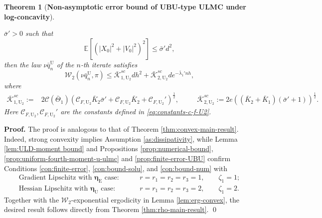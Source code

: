 \documentclass[12pt]{article}
\newenvironment{redtext}
  {\color{black}\ignorespaces}
  {\ignorespacesafterend}
\numberwithin{equation}{section}
\renewenvironment{proof}%
  {\begin{trivlist}%
   \item[]\ignorespaces}%
  {\qed\end{trivlist}}
\newtheorem{thm}{Theorem}[section]
\begin{document}
\begin{redtext}
\begin{thm}[\textbf{Non-asymptotic error bound of UBU-type ULMC under log-concavity}]
\begin{enumerate}
\(\bar\sigma'>0\) such that
\begin{equation}
\label{eq:condition-of-initial-value-UBU-hl}
\mathbb E
\left[
\left(
|X_0|^2+|V_0|^2
\right)^2
\right]
\leq
\bar\sigma' d^2,
\end{equation}
then the law \(\nu\bar q^{\mathrm U}_n\) of the \(n\)-th iterate satisfies
\begin{equation}
\label{eq:convex-main-result-UBU}
\mathcal W_2
\left(
\nu\bar q^{\mathrm U}_n,
\pi
\right)
\leq
\bar{\mathcal K}_{1,\mathrm{U}_2}^{sc}
d h^2
+
\bar{\mathcal K}_{2,\mathrm{U}_2}^{sc}
d
e^{-\bar\lambda_1'nh},
\end{equation}
where
\begin{align*}
\bar{\mathcal K}_{1,\mathrm{U}_2}^{sc}
:={}&
2
\mathcal C(\bar\Theta_1)
\left(
\mathcal C_{F,\mathrm{U}_2}\bar K_2\bar\sigma' 
+
\mathcal C_{F,\mathrm{U}_2}\bar K_2
+
\mathcal C_{F,\mathrm{U}_2}'
\right)^{\frac12},
&\quad&
\bar{\mathcal K}_{2,\mathrm{U}_2}^{sc}
:=
2e
\left(
(\bar K_2+\bar K_1)
(\bar\sigma' +1)
\right)^{\frac12}.
\end{align*}
Here \(\mathcal C_{F,\mathrm{U}_2},\mathcal C_{F,\mathrm{U}_2}'\) are the constants defined in \eqref{eq:constants-c-f-U2}.
\end{enumerate}


\end{thm}

\begin{proof}
\textbf{Proof.}
The proof is analogous to that of Theorem
\ref{thm:convex-main-result}. Indeed, strong convexity implies
Assumption \ref{as:dissipativity}, while Lemma
\ref{lem:ULD-moment bound} and Propositions \ref{prop:numerical-bound}, \ref{prop:uniform-fourth-moment-u-ulmc} and
\ref{prop:finite-error-UBU} confirm Conditions
\ref{con:finite-error}, \ref{con:bound-solu}, and
\ref{con:bound-num} with
\begin{align}
\text{Gradient Lipschitz with } \boldsymbol{\eta}_\mathrm{E} \text{ case}:&
\qquad
r=r_1=r_2=r_3=1,
\qquad
\zeta_1=1; \\
\text{Hessian Lipschitz with } \boldsymbol{\eta}_\mathrm{U} \text{ case}:&
\qquad
r=r_1=r_2=r_3=2,
\qquad
\zeta_1=2.
\end{align}
Together with the \(\mathcal W_2\)-exponential ergodicity in
Lemma \ref{lem:erg-convex}, the desired result follows directly
from Theorem \ref{thm:rho-main-result}.
\end{proof}


\end{redtext}
\end{document}
